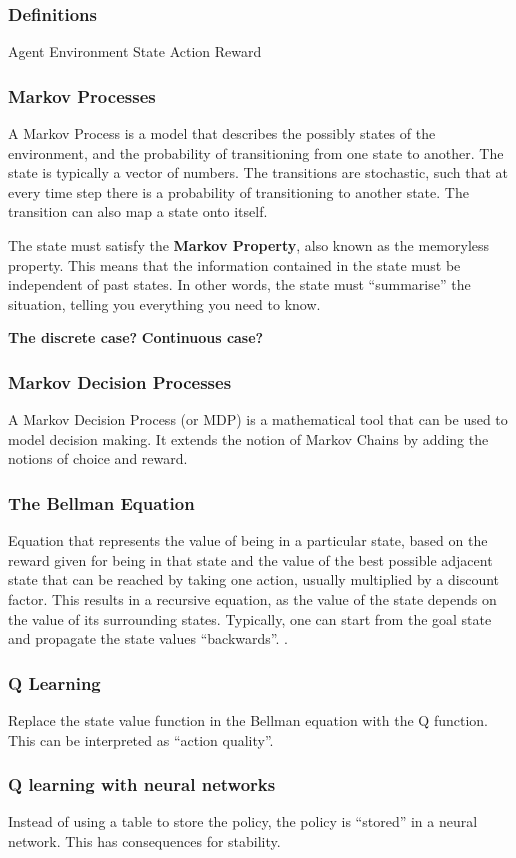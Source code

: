 \subsubsection{Definitions}
Agent
Environment
State
Action
Reward

\subsubsection{Markov Processes}
A Markov Process is a model that describes the possibly states of the
environment, and the probability of transitioning from one state to
another. The state is typically a vector of numbers. The transitions
are stochastic, such that at every time step there is a probability of
transitioning to another state. The transition can also map a state
onto itself.

The state must satisfy the \textbf{Markov Property}, also known as the
memoryless property. This means that the information contained in the
state must be independent of past states. In other words, the state
must ``summarise'' the situation, telling you everything you need to
know.

\textbf{The discrete case?}
\textbf{Continuous case?}



\subsubsection{Markov Decision Processes}
A Markov Decision Process (or MDP) is a mathematical tool that can be
used to model decision making. It extends the notion of Markov Chains
by adding the notions of choice and reward.

\subsubsection{The Bellman Equation}
Equation that represents the value of being in a particular state,
based on the reward given for being in that state and the value of the
best possible adjacent state that can be reached by taking one action,
usually multiplied by a discount factor. This results in a recursive
equation, as the value of the state depends on the value of its
surrounding states. Typically, one can start from the goal state and
propagate the state values ``backwards''. .

\subsubsection{Q Learning}
Replace the state value function in the Bellman equation with the Q
function. This can be interpreted as ``action quality''.

\subsubsection{Q learning with neural networks}
Instead of using a table to store the policy, the policy is ``stored''
in a neural network. This has consequences for stability.




